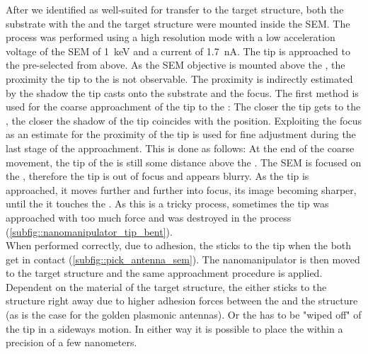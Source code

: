 	After we identified \nds as well-suited for transfer to the target structure, both the substrate with the \nds and the target structure were mounted inside the SEM. 
	The process was performed using a high resolution mode with a low acceleration voltage of the SEM of \SI{1}{\kilo\electronvolt} and a current of \SI{1.7}{\nano\ampere}.
	The tip is approached to the pre-selected \nd from above.
	As the SEM objective is mounted above the \np, the proximity the \np tip  to the \nd is not observable.
	The proximity is indirectly estimated by the shadow the tip casts onto the substrate and the focus.
	The first method is used for the coarse approachment of the tip to the \nd: The closer the tip gets to the \nd, the closer the shadow of the tip coincides with the \nd position.
	Exploiting the focus as an estimate for the proximity of the tip is used for fine adjustment during the last stage of the approachment.
	This is done as follows: 
	At the end of the coarse movement, the tip of the \np is still some distance above the \nd.
	The SEM is focused on the \nd, therefore the \np tip is out of focus and appears blurry.
	As the tip is approached, it moves further and further into focus, its image becoming sharper, until the it touches the \nd.
	As this is a tricky process, sometimes the tip was approached with too much force and was destroyed in the process (\cref{subfig::nanomanipulator_tip_bent}).
	\\
	When performed correctly, due to adhesion, the \nd sticks to the \np tip when the both get in contact (\cref{subfig::pick_antenna_sem}).
	The nanomanipulator is then moved to the target structure and the same approachment procedure is applied.
	Dependent on the material of the target structure, the \nd either sticks to the structure right away due to higher adhesion forces between the \nd and the structure (as is the case for the golden plasmonic antennas).
	Or the \nd has to be "wiped off" of the \np tip in a sideways motion.
	In either way it is possible to place the \nd within a precision of a few nanometers.
	\\



